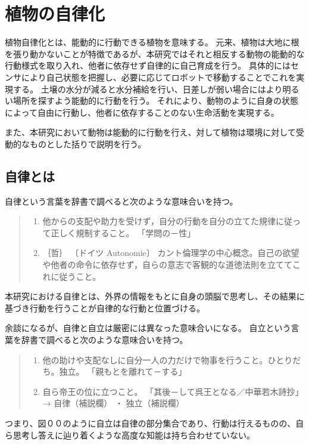 \chapter{植物の自律化}
植物自律化とは、能動的に行動できる植物を意味する。
元来、植物は大地に根を張り動かないことが特徴であるが、本研究ではそれと相反する動物の能動的な行動様式を取り入れ、他者に依存せず自律的に自己育成を行う。
具体的にはセンサにより自己状態を把握し、必要に応じてロボットで移動することでこれを実現する。
土壌の水分が減ると水分補給を行い、日差しが弱い場合にはより明るい場所を探すよう能動的に行動を行う。
それにより、動物のように自身の状態によって自由に行動し、他者に依存することのない生命活動を実現する。
\par また、本研究において動物は能動的に行動を行え、対して植物は環境に対して受動的なものとした括りで説明を行う。

\section{自律とは}
自律という言葉を辞書で調べると次のような意味合いを持つ。
\begin{quote}
\begin{enumerate}
    \item 他からの支配や助力を受けず，自分の行動を自分の立てた規律に従って正しく規制すること。 「学問の－性」

    \item ｛哲｝ 〔ドイツ Autonomie〕 カント倫理学の中心概念。自己の欲望や他者の命令に依存せず，自らの意志で客観的な道徳法則を立ててこれに従うこと。
\end{enumerate}
\end{quote}
本研究における自律とは、外界の情報をもとに自身の頭脳で思考し、その結果に基づき行動を行うことが自律的な行動と位置づける。
\par 余談になるが、自律と自立は厳密には異なった意味合いになる。
自立という言葉を辞書で調べると次のような意味合いを持つ。 
\begin{quote}
\begin{enumerate}
    \item 他の助けや支配なしに自分一人の力だけで物事を行うこと。ひとりだち。独立。 「親もとを離れて－する」

    \item 自ら帝王の位に立つこと。 「其後－して呉王となる／中華若木詩抄」 → 自律（補説欄） ・ 独立（補説欄）
\end{enumerate}
\end{quote}
つまり、図００のように自立は自律の部分集合であり、行動は行えるものの、自ら思考し答えに辿り着くような高度な知能は持ち合わせていない。


